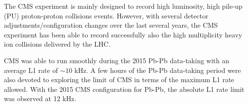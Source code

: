 The CMS experiment is mainly designed to record high luminosity, high pile-up (PU) proton-proton collisions events.  However, with several detector adjustments/configuration changes over the last several years, the CMS experiment has been able to record successfully also the high multiplicity heavy ion collisions delivered by the LHC. 

 





CMS was able to run smoothly during the 2015 Pb-Pb data-taking with an average L1 rate of $\sim 10$ kHz. A few hours of the Pb-Pb data-taking
period were also devoted to exploring the limit of CMS in terms of the maximum L1 rate allowed.  With the 2015 CMS configuration for Pb-Pb, the absolute L1 rate limit was observed at 12 kHz. 

